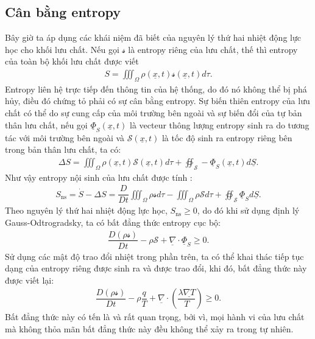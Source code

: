 \documentclass[../../../main.tex]{subfiles}
\begin{document}
\subsection{Cân bằng entropy}
    Bây giờ ta áp dụng các khái niệm đã biết của nguyên lý thứ hai nhiệt động lực học cho khối lưu chất. Nếu gọi $\mathcal{s}$ là entropy riêng của lưu chất, thế thì entropy của toàn bộ khối lưu chất được viết 
        \begin{align}
            S=\iiint_{\Omega}\rho\left(\underline{x},t\right)\mathcal{s}\left(\underline{x},t\right)d\tau.
        \end{align}
    Entropy liên hệ trực tiếp đến thông tin của hệ thống, do đó nó không thể bị phá hủy, điều đó chứng tỏ phải có sự cân bằng entropy. Sự biến thiên entropy của lưu chất có thể do sự cung cấp của môi trường bên ngoài và sự biến đổi của tự bản thân lưu chất, nếu gọi $\underline{\Phi}_S\left(\underline{x},t\right)$ là vecteur thông lượng entropy sinh ra do tương tác với môi trường bên ngoài và $\mathscr{S}\left(\underline{x},t\right)$ là tốc độ sinh ra entropy riêng bên trong bản thân lưu chất, ta có:
    \begin{align}
        \Delta S=\iiint_{\Omega}\rho\left(\underline{x},t\right)\mathscr{S}\left(\underline{x},t\right)d\tau+\oiint_\mathscr{S}-\underline{\Phi}_S\left(\underline{x},t\right)d\underline{S}.
    \end{align}
    Như vậy entropy nội sinh của lưu chất được tính :
    \begin{align}
        S_{\text{ns}}=\dot{S}-\Delta S=\dfrac{D}{Dt}\iiint_{\Omega} \rho\mathcal{s}d\tau-\iiint_{\Omega}\rho \mathscr{S}d\tau+\oiint_\mathscr{S}\underline{\Phi}_Sd\underline{S}.
        \end{align}
    Theo nguyên lý thứ hai nhiệt động lực học, $\boxed{S_{\text{ns}}\ge0}$, do đó khi sử dụng định lý Gauss-Odtrogradsky, ta có bất đẳng thức entropy cục bộ:
        \begin{align}
            \dfrac{D(\rho\mathcal{s})}{Dt}-\rho\mathscr{S}+\underline{\nabla}\cdot\underline{\Phi}_S\ge 0.
        \end{align}
    Sử dụng các mật độ trao đổi nhiệt trong phần trên, ta có thể khai thác tiếp tục dạng của entropy riêng được sinh ra và được trao đổi, khi đó, bất đẳng thức này được viết lại:
        \begin{align}
            \boxed{
                \dfrac{D(\rho\mathcal{s})}{Dt} - \rho\dfrac{q}{T} + \underline{\nabla}\cdot\left(\dfrac{\lambda\underline{\nabla T}}{T}\right)\ge0}.
        \end{align}
    Bất đẳng thức này có tến là  và rất quan trọng, bởi vì, mọi hành vi của lưu chất mà không thỏa mãn bất đẳng thức này đều không thể xảy ra trong tự nhiên.
\end{document}
